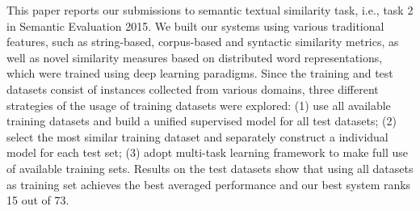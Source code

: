 This paper reports our submissions to semantic textual similarity task, i.e., task 2 in Semantic Evaluation 2015. We built our systems using various traditional features, such as string-based, corpus-based and syntactic similarity metrics, as well as novel similarity measures based on distributed word representations, which were trained using deep learning paradigms. Since the training and test datasets consist of instances collected from various domains, three different strategies of the usage of training datasets were explored: (1) use all available training datasets and build a unified supervised model for all test datasets; (2) select the most similar training dataset and separately construct a individual model for each test set; (3) adopt multi-task learning framework to make full use of available training sets. Results on the test datasets show that using all datasets as training set achieves the best averaged performance and our best system ranks 15 out of 73.
